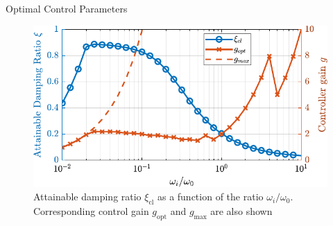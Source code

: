 \documentclass[t, minted]{clean-beamer}
\begin{document}
\begin{frame}[label={sec:org84c72de}]{Optimal Control Parameters}
\vspace{1em}

\begin{figure}[htbp]
\centering
\includegraphics[width=\linewidth]{figs/mod_iff_damping_wi.pdf}
\caption{Attainable damping ratio \(\xi_\text{cl}\) as a function of the ratio \(\omega_i/\omega_0\). Corresponding control gain \(g_\text{opt}\) and \(g_\text{max}\) are also shown}
\end{figure}
\end{frame}
\end{document}

